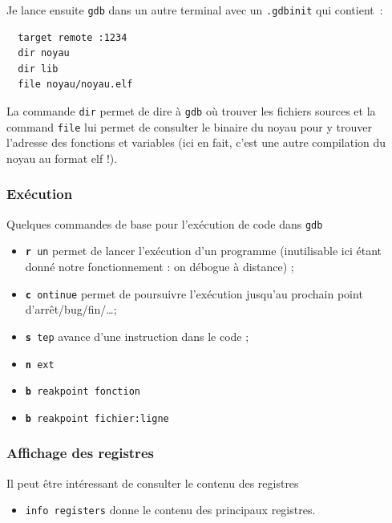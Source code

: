    Je lance ensuite {\tt gdb} dans un autre terminal avec un
\lstinline!.gdbinit! qui contient~:

\begin{verbatim}
  target remote :1234
  dir noyau
  dir lib
  file noyau/noyau.elf
\end{verbatim}

   La commande \lstinline!dir! permet de dire à {\tt gdb} où trouver
les fichiers sources et la command \lstinline:file: lui permet de
consulter le binaire du noyau pour y trouver l'adresse des fonctions
et variables (ici en fait, c'est une autre compilation du noyau au
format {\sc elf} !).

%
\subsubsection{Exécution}

   Quelques commandes de base pour l'exécution de code dans {\tt gdb}

\begin{itemize}
     \item {\tt {\bf r} un} permet de lancer l'exécution d'un
       programme (inutilisable ici étant donné notre fonctionnement :
       on débogue à distance) ;
     \item {\tt {\bf c} ontinue} permet de poursuivre l'exécution jusqu'au
       prochain point d'arrêt/bug/fin/\ldots ;
     \item {\tt {\bf s} tep} avance d'une instruction dans le code ;
     \item {\tt {\bf n} ext}
     \item {\tt {\bf b} reakpoint fonction}
     \item {\tt {\bf b} reakpoint fichier:ligne}
\end{itemize}

%
\subsubsection{Affichage des registres}

   Il peut être intéressant de consulter le contenu des registres

\begin{itemize}
     \item {\tt info registers} donne le contenu des principaux registres.
\end{itemize}

